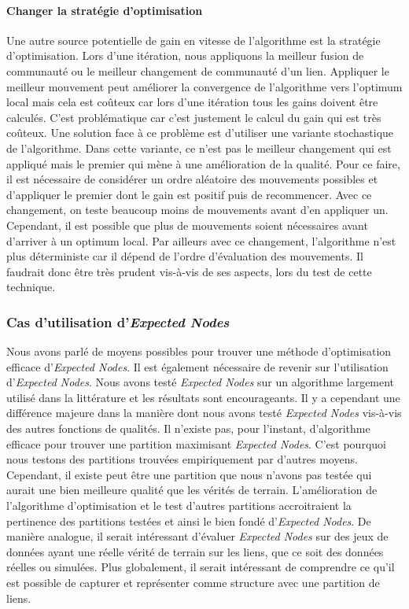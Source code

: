 \paragraph{Changer la stratégie d'optimisation}
Une autre source potentielle de gain en vitesse de l'algorithme est la stratégie d'optimisation.
Lors d'une itération, nous appliquons la meilleur fusion de communauté ou le meilleur changement de communauté d'un lien.
Appliquer le meilleur mouvement peut améliorer la convergence de l'algorithme vers l'optimum local mais cela est coûteux car lors d'une itération tous les gains doivent être calculés.
C'est problématique car c'est justement le calcul du gain qui est très coûteux.
Une solution face à ce problème est d'utiliser une variante stochastique de l'algorithme.
Dans cette variante, ce n'est pas le meilleur changement qui est appliqué mais le premier qui mène à une amélioration de la qualité.
Pour ce faire, il est nécessaire de considérer un ordre aléatoire des mouvements possibles et d'appliquer le premier dont le gain est positif puis de recommencer.
Avec ce changement, on teste beaucoup moins de mouvements avant d'en appliquer un.
Cependant, il est possible que plus de mouvements soient nécessaires avant d'arriver à un optimum local.
Par ailleurs avec ce changement, l'algorithme n'est plus déterministe car il dépend de l'ordre d'évaluation des mouvements.
Il faudrait donc être très prudent vis-à-vis de ses aspects, lors du test de cette technique.

\subsubsection{Cas d'utilisation d'\emph{Expected Nodes}}
Nous avons parlé de moyens possibles pour trouver une méthode d'optimisation efficace d'\emph{Expected Nodes}.
Il est également nécessaire de revenir sur l'utilisation d'\emph{Expected Nodes}.
Nous avons testé \emph{Expected Nodes} sur un algorithme largement utilisé dans la littérature et les résultats sont encourageants.
Il y a cependant une différence majeure dans la manière dont nous avons testé \emph{Expected Nodes} vis-à-vis des autres fonctions de qualités.
Il n'existe pas, pour l'instant, d'algorithme efficace pour trouver une partition maximisant \emph{Expected Nodes}.
C'est pourquoi nous testons des partitions trouvées empiriquement par d'autres moyens.
Cependant, il existe peut être une partition que nous n'avons pas testée qui aurait une bien meilleure qualité que les vérités de terrain.
L'amélioration de l'algorithme d'optimisation et le test d'autres partitions accroitraient la pertinence des partitions testées et ainsi le bien fondé d'\emph{Expected Nodes}.
De manière analogue, il serait intéressant d'évaluer \emph{Expected Nodes} sur des jeux de données ayant une réelle vérité de terrain sur les liens, que ce soit des données réelles ou simulées.
Plus globalement, il serait intéressant de comprendre ce qu'il est possible de capturer et représenter comme structure avec une partition de liens.

